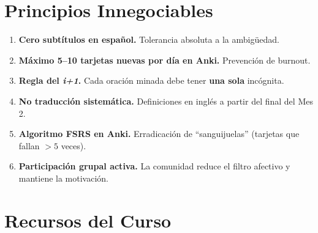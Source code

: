 \documentclass[12pt,a4paper]{article}
\begin{document}
\section*{Principios Innegociables}

\begin{enumerate}[leftmargin=1.5cm, label=\textbf{\arabic*.}]
  \item \textbf{Cero subtítulos en español.} Tolerancia absoluta a la ambigüedad.
  \item \textbf{Máximo 5--10 tarjetas nuevas por día en Anki.} Prevención de burnout.
  \item \textbf{Regla del \textit{i+1}.} Cada oración minada debe tener \textbf{una sola} incógnita.
  \item \textbf{No traducción sistemática.} Definiciones en inglés a partir del final del Mes 2.
  \item \textbf{Algoritmo FSRS en Anki.} Erradicación de ``sanguijuelas'' (tarjetas que fallan $>5$ veces).
  \item \textbf{Participación grupal activa.} La comunidad reduce el filtro afectivo y mantiene la motivación.
\end{enumerate}

\section*{Recursos del Curso}
\end{document}

